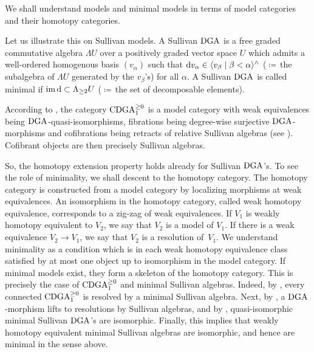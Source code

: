 \documentclass[\MainFolder/Text.tex]{subfiles}
\begin{document}
\begin{Remark}\label{Rem:Models}
We shall understand models and minimal models in terms of model categories and their homotopy categories.

Let us illustrate this on Sullivan models. A Sullivan $\mathrm{DGA}$ is a free graded commutative algebra $\Lambda U$ over a positively graded vector space $U$ which admits a well-ordered homogenous basis $(v_\alpha)$ such that $\mathrm{d} v_\alpha \in \langle  v_\beta \mid \beta < \alpha \rangle^\wedge$ ($\coloneqq$\,the subalgebra of $\Lambda U$ generated by the $v_\beta$'s) for all $\alpha$. A Sullivan $\mathrm{DGA}$ is called minimal if $\operatorname{im} \mathrm{d} \subset \Lambda_{\ge 2} U$ ($\coloneqq$\,the set of decomposable elements).

According to \cite[Theorem~4.3]{Bousfield1976}, the category $\mathrm{CDGA}_{1}^{\ge 0}$ is a model category with weak equivalences being $\mathrm{DGA}$-quasi-isomorphisms, fibrations being degree-wise surjective $\mathrm{DGA}$-morphisms and cofibrations being retracts of relative Sullivan algebras (see \cite[Proposition~2.22 and Proposition~2.28]{Felix2008}). Cofibrant objects are then precisely Sullivan algebras. 

So, the homotopy extension property holds already for Sullivan $\mathrm{DGA}$'s. To see the role of minimality, we shall descent to the homotopy category. The homotopy category is constructed from a model category by localizing morphisms at weak equivalences. An isomorphism in the homotopy category, called weak homotopy equivalence, corresponds to a zig-zag of weak equivalences. If $V_1$ is weakly homotopy equivalent to $V_2$, we say that $V_2$ is a model of $V_1$. If there is a weak equivalence $V_2 \rightarrow V_1$, we say that $V_2$ is a resolution of~$V_1$. We understand minimality as a condition which is in each weak homotopy equivalence class satisfied by at most one object up to isomorphism in the model category. If minimal models exist, they form a skeleton of the homotopy category. This is precisely the case of $\mathrm{CDGA}_{1}^{\ge 0}$ and minimal Sullivan algebras. Indeed, by \cite[Theorem~2.24]{Felix2008}, every connected $\mathrm{CDGA}_{1}^{\ge 0}$ is resolved by a minimal Sullivan algebra. Next, by \cite[Proposition~2.26]{Felix2008}, a $\mathrm{DGA}$-morphism lifts to resolutions by Sullivan algebras, and by \cite[Corollary~2.13]{Felix2008}, quasi-isomorphic minimal Sullivan $\mathrm{DGA}$'s are isomorphic. Finally, this implies that weakly homotopy equivalent minimal Sullivan algebras are isomorphic, and hence are minimal in the sense above.


\end{Remark}
\end{document}
